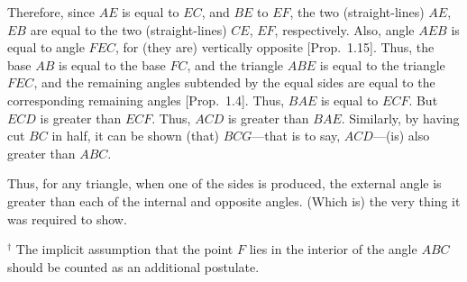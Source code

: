 \begin{Parallel}{}{}
{\epsfysize=2.7in
\centerline{}

 Therefore, since $AE$ is equal to $EC$, and $BE$ to $EF$, the two (straight-lines)
 $AE$, $EB$ are equal to the two (straight-lines) $CE$, $EF$, respectively. 
 Also, angle $AEB$ is equal to angle $FEC$, for (they are)
 vertically opposite [Prop.~1.15]. Thus, the base $AB$ is equal to the base
 $FC$, and the triangle $ABE$ is equal to the triangle $FEC$, and the remaining
 angles subtended by the equal sides are equal to the corresponding remaining angles [Prop.~1.4]. Thus, $BAE$ is equal to $ECF$. But $ECD$ is greater than $ECF$. Thus,
 $ACD$ is greater than $BAE$. Similarly, by having cut $BC$ in half,  it can  be shown (that) $BCG$---that is to say, $ACD$---(is) also greater than $ABC$.
 
 Thus, for any triangle, when one of the sides is produced, the external angle
is greater than each of the internal and opposite angles. (Which is) the very thing
it was required to show.}
\end{Parallel}
{\footnotesize
\noindent $^\dag$  The implicit assumption that the point $F$ lies in the
 interior of the angle $ABC$ should be counted as an additional postulate.} 
 

